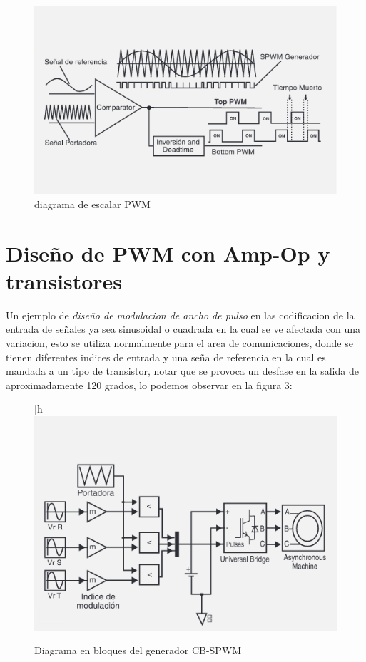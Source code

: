 \documentclass[11pt,a4paper]{article}
\begin{document}
\begin{figure}[h]
\begin{center}
\includegraphics[scale=0.6]{2.png}
\caption{diagrama de escalar PWM}
\end{center}
\end{figure}

\newpage

\section{Diseño de PWM con Amp-Op y transistores}
Un ejemplo de \emph{diseño de modulacion de ancho de pulso} en las codificacion de la entrada de señales ya sea sinusoidal o cuadrada en la cual se ve afectada con una variacion, esto se utiliza normalmente para el area de comunicaciones, donde se tienen diferentes indices de entrada y una seña de referencia en la cual es mandada a un tipo de transistor, notar que se provoca un desfase en la salida de aproximadamente 120 grados, lo podemos observar en la figura 3:\cite{contreras2005modulacion}

\begin{figure}
\begin{center}[h]
\includegraphics[scale=0.7]{3.png}
\caption{Diagrama en bloques del generador CB-SPWM}
\end{center}
\end{figure}


 

\end{document}

